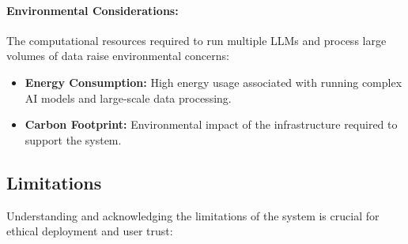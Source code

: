 \paragraph{Environmental Considerations:}\label{subsubsec:environmental-considerations}
The computational resources required to run multiple LLMs and process large volumes of data raise environmental concerns:
\begin{itemize}
    \item \textbf{Energy Consumption:} High energy usage associated with running complex AI models and large-scale data processing.
    \item \textbf{Carbon Footprint:} Environmental impact of the infrastructure required to support the system.
\end{itemize}

\subsection{Limitations}\label{subsec:limitations}
Understanding and acknowledging the limitations of the system is crucial for ethical deployment and user trust:

